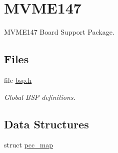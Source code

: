\hypertarget{group__RTEMSBSPsM68kMVME147}{}\section{M\+V\+M\+E147}
\label{group__RTEMSBSPsM68kMVME147}


M\+V\+M\+E147 Board Support Package.  


\subsection*{Files}
\begin{DoxyCompactItemize}
\item 
file \mbox{\hyperlink{bsps_2m68k_2mvme147_2include_2bsp_8h}{bsp.\+h}}
\begin{DoxyCompactList}\small\item\em Global B\+SP definitions. \end{DoxyCompactList}\end{DoxyCompactItemize}
\subsection*{Data Structures}
\begin{DoxyCompactItemize}
\item 
struct \mbox{\hyperlink{structpcc__map}{pcc\+\_\+map}}
\end{DoxyCompactItemize}
